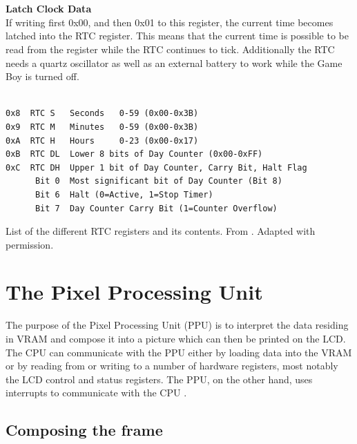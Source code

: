 \\\\
\textbf{Latch Clock Data}
\\
If writing first 0x00, and then 0x01 to this register, the current time becomes latched into the RTC register. This means that the current time is possible to be read from the register while the RTC continues to tick. Additionally the RTC needs a quartz oscillator as well as an external battery to work while the Game Boy is turned off. 
\\\\
\begin{table}[H]
    \begin{center}

\begin{BVerbatim}
0x8  RTC S   Seconds   0-59 (0x00-0x3B)
0x9  RTC M   Minutes   0-59 (0x00-0x3B)
0xA  RTC H   Hours     0-23 (0x00-0x17)
0xB  RTC DL  Lower 8 bits of Day Counter (0x00-0xFF)
0xC  RTC DH  Upper 1 bit of Day Counter, Carry Bit, Halt Flag
      Bit 0  Most significant bit of Day Counter (Bit 8)
      Bit 6  Halt (0=Active, 1=Stop Timer)
      Bit 7  Day Counter Carry Bit (1=Counter Overflow)
\end{BVerbatim}

    \caption{List of the different RTC registers and its contents. From \cite{pandocsmbc}. Adapted with permission.}
    \label{tab:rtc_registers}
    \end{center}
\end{table}




\section{The Pixel Processing Unit}
\label{sec:PPU}

The purpose of the Pixel Processing Unit (PPU) is to interpret the data residing in VRAM and compose it into a picture which can then be printed on the LCD. The CPU can communicate with the PPU either by loading data into the VRAM or by reading from or writing to a number of hardware registers, most notably the LCD control and status registers. The PPU, on the other hand, uses interrupts to communicate with the CPU \cite{pandocsVideo}.

\subsection{Composing the frame}
\label{sec:PPU_image}

